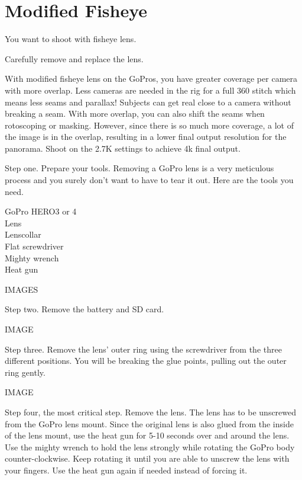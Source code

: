 \chapter{Modified Fisheye}
\pagecolor{white}
\label{chap:26}
\begin{fullwidth}

\problem

{\large You want to shoot with fisheye lens. \par}


\solution

{\large Carefully remove and replace the lens. \par}

With modified fisheye lens on the GoPros, you have greater coverage per camera with more overlap. Less cameras are needed in the rig for a full 360 stitch which means less seams and parallax! Subjects can get real close to a camera without breaking a seam. With more overlap, you can also shift the seams when rotoscoping or masking. However, since there is so much more coverage, a lot of the image is in the overlap, resulting in a lower final output resolution for the panorama. Shoot on the 2.7K settings to achieve 4k final output. 


Step one. Prepare your tools. Removing a GoPro lens is a very meticulous process and you surely don't want to have to tear it out. Here are the tools you need. 

GoPro HERO3 or 4
\\
Lens
\\
Lenscollar
\\
Flat screwdriver
\\
Mighty wrench
\\
Heat gun

IMAGES

Step two. Remove the battery and SD card.

IMAGE

Step three. Remove the lens' outer ring using the screwdriver from the three different positions. You will be breaking the glue points, pulling out the outer ring gently.

IMAGE

Step four, the most critical step. Remove the lens. The lens has to be unscrewed from the GoPro lens mount. Since the original lens is also glued from the inside of the lens mount, use the heat gun for 5-10 seconds over and around the lens. Use the mighty wrench to hold the lens strongly while rotating the GoPro body counter-clockwise. Keep rotating it until you are able to unscrew the lens with your fingers. Use the heat gun again if needed instead of forcing it.


\end{fullwidth}
